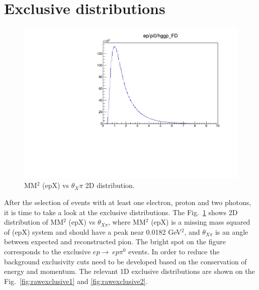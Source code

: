 \clearpage
\section{Exclusive distributions}\label{sec:eventselection}





\begin{figure}
	\vspace*{-0.3cm}
	\includegraphics[page=10,width=0.97\linewidth]{Chapters/Ch4-BaseAnalysis/1_Exclusivity_Cuts/figures/eppi0.exclusive.pdf}
	\caption{MM$^2$ (epX) vs $\theta_X\pi$ 2D distribution.}
	\label{fig:MM2vsThetaXPi}
\end{figure}
After the selection of events with at least one electron, proton and two photons, it is time to take a look at the exclusive distributions.
The Fig.~\ref{fig:MM2vsThetaXPi} shows 2D distribution of MM$^2$ (epX) vs $\theta_{X\pi}$, where MM$^2$ (epX) is a missing mass squared of (epX) system and should have a peak near 0.0182 GeV$^2$, and $\theta_{X\pi}$ is an angle between expected and reconstructed pion.
The bright spot on the figure corresponds to the exclusive $ep\rightarrow~ep\pi^0$ events.
In order to reduce the background exclusivity cuts  need to be developed based on the conservation of energy and momentum.
The relevant 1D exclusive distributions are shown on the Fig.~\ref{fig:rawexclusive1} and \ref{fig:rawexclusive2}.

